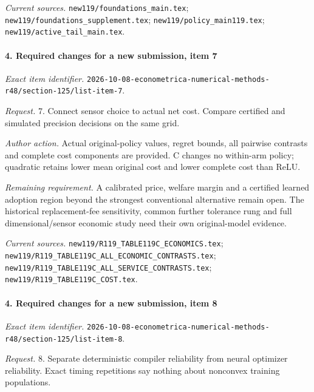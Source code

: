 \par\emph{Current sources.} \nolinkurl{new119/foundations_main.tex}; \nolinkurl{new119/foundations_supplement.tex}; \nolinkurl{new119/policy_main119.tex}; \nolinkurl{new119/active_tail_main.tex}.

\paragraph{4. Required changes for a new submission, item 7}

\emph{Exact item identifier.} \nolinkurl{2026-10-08-econometrica-numerical-methods-r48/section-125/list-item-7}.

\par\emph{Request.} 7. Connect sensor choice to actual net cost. Compare certified and simulated precision decisions on the same grid.

\par\emph{Author action.} Actual original-policy values, regret bounds, all pairwise contrasts and complete cost components are provided. C changes no within-arm policy; quadratic retains lower mean original cost and lower complete cost than ReLU.

\par\emph{Remaining requirement.} A calibrated price, welfare margin and a certified learned adoption region beyond the strongest conventional alternative remain open. The historical replacement-fee sensitivity, common further tolerance rung and full dimensional/\allowbreak{}sensor economic study need their own original-model evidence.

\par\emph{Current sources.} \nolinkurl{new119/R119_TABLE119C_ECONOMICS.tex}; \nolinkurl{new119/R119_TABLE119C_ALL_ECONOMIC_CONTRASTS.tex}; \nolinkurl{new119/R119_TABLE119C_ALL_SERVICE_CONTRASTS.tex}; \nolinkurl{new119/R119_TABLE119C_COST.tex}.

\paragraph{4. Required changes for a new submission, item 8}

\emph{Exact item identifier.} \nolinkurl{2026-10-08-econometrica-numerical-methods-r48/section-125/list-item-8}.

\par\emph{Request.} 8. Separate deterministic compiler reliability from neural optimizer reliability. Exact timing repetitions say nothing about nonconvex training populations.

